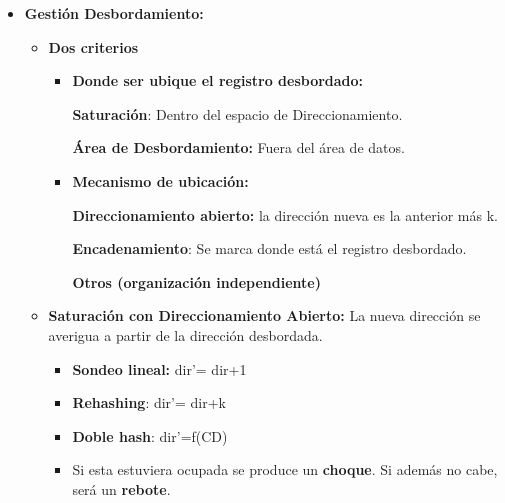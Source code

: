 \documentclass[12pt, twoside, openright]{report} %
\begin{document}
\begin{itemize}
\begin{itemize}
\begin{itemize}
\begin{itemize}
          \end{itemize}
        \end{itemize}
      \end{itemize}
    \item \textbf{Gestión Desbordamiento:}
      

      \begin{itemize}
      \item \textbf{Dos criterios}
        

        \begin{itemize}
        \item \textbf{Donde ser ubique el registro desbordado:}
          

       
		  
            \textbf{Saturación}: Dentro del espacio de Direccionamiento.
          
			
            \textbf{Área de Desbordamiento:} Fuera del área de datos.
            
			
        \item \textbf{Mecanismo de ubicación:}
          

          
            \textbf{Direccionamiento abierto:} la dirección nueva es la
            anterior más k.
           
			
            \textbf{Encadenamiento}: Se marca donde está el registro
            desbordado.
           
			
            \textbf{Otros (organización independiente)}
          
			
        \end{itemize}
      \item \textbf{Saturación con Direccionamiento Abierto:} La nueva
        dirección se averigua a partir de la dirección desbordada.
        

        \begin{itemize}
        \item \textbf{Sondeo lineal:} dir'= dir+1
          
        \item \textbf{Rehashing}: dir'= dir+k
          
        \item \textbf{Doble hash}: dir'=f(CD)
          
        \end{itemize}

        \begin{itemize}
        \item Si esta estuviera ocupada se produce un \textbf{choque}. Si
          además no cabe, será un \textbf{rebote}.
          

\end{itemize}
\end{itemize}
\end{itemize}
\end{document}
